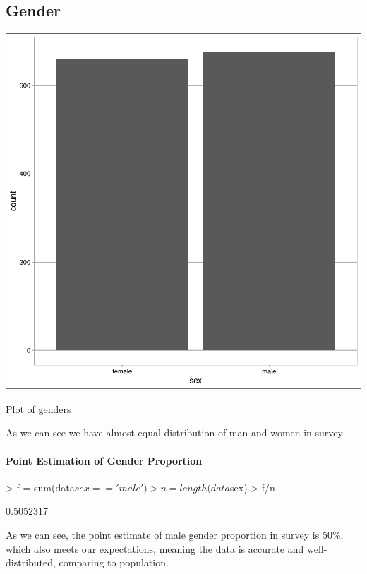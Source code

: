 \documentclass{article}
\begin{document}
\subsection{Gender}

\begin{centerfig}
\includegraphics{Untitled-005}
\caption{Plot of genders}
\end{centerfig}
As we can see we have almost equal distribution of man and women in survey
\paragraph{Point Estimation of Gender Proportion \newline} 

\begin{Schunk}
\begin{Sinput}
>   f = sum(data$sex=='male')
>   n = length(data$sex)
>   f/n
\end{Sinput}
\begin{Soutput}
[1] 0.5052317
\end{Soutput}
\end{Schunk}

As we can see, the point estimate of male gender proportion in survey is 50\%, which also meets our expectations, meaning the data is accurate and well-distributed, comparing to population.
\end{document}
